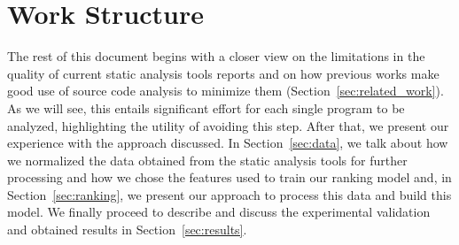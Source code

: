 \section{Work Structure}
\label{sec:structure}

The rest of this document begins with a closer view on the limitations in the
quality of current static analysis tools reports and on how previous works make
good use of source code analysis to minimize them
(Section~\ref{sec:related_work}). As we will see, this entails significant
effort for each single program to be analyzed, highlighting the utility of
avoiding this step. After that, we present our experience with the approach
discussed. In Section~\ref{sec:data}, we talk about how we normalized the data
obtained from the static analysis tools for further processing and how we chose
the features used to train our ranking model and, in Section~\ref{sec:ranking},
we present our approach to process this data and build this model. We finally
proceed to describe and discuss the experimental validation and obtained
results in Section~\ref{sec:results}.
